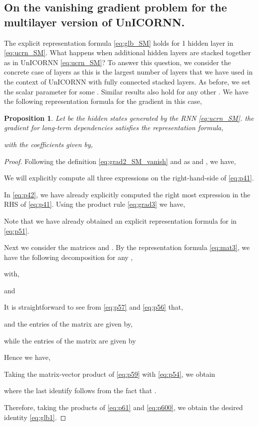 \documentclass[a4paper]{article}
\newtheorem{proposition}[theorem]{Proposition}
\begin{document}
 \subsection{On the vanishing gradient problem for the multilayer version of UnICORNN.}
 The explicit representation formula \eqref{eq:glb_SM} holds for 1 hidden layer in \eqref{eq:ucrn_SM}. What happens when additional hidden layers are stacked together as in UnICORNN \eqref{eq:ucrn_SM}? To answer this question, we consider the concrete case of  layers as this is the largest number of layers that we have used in the context of UnICORNN with fully connected stacked layers. As before, we set the scalar parameter  for some . Similar results also hold for any other . We have the following representation formula for the gradient in this case,
 \begin{proposition}
\label{prop:5}
Let  be the hidden states generated by the RNN \eqref{eq:ucrn_SM}.  the gradient for long-term dependencies satisfies the representation formula,

 with the coefficients given by,
 
\end{proposition}
\begin{proof}
Following the definition \eqref{eq:grad2_SM_vanish} and as  and , we have,

We will explicitly compute all three expressions on the right-hand-side of \eqref{eq:p41}.

In \eqref{eq:p42}, we have already explicitly computed the right most expression in the RHS of \eqref{eq:p41}. 
Using the product rule \eqref{eq:grad3} we have,

Note that we have already obtained an explicit representation formula for  in \eqref{eq:p51}. 

Next we consider the matrices  and . By the representation formula \eqref{eq:mat3}, we have the following decomposition for any ,

with,

and

It is straightforward to see from \eqref{eq:p57} and \eqref{eq:p56} that,

and the entries of the  matrix  are given by,

while the entries of the  matrix  are given by


Hence we have,

Taking the matrix-vector product of \eqref{eq:p59} with \eqref{eq:p54}, we obtain

where the last identify follows from the fact that .

 Therefore, taking the products of \eqref{eq:p61} and \eqref{eq:p600}, we obtain the desired identity \eqref{eq:glb1}. 
 




\end{proof}
\end{document}
